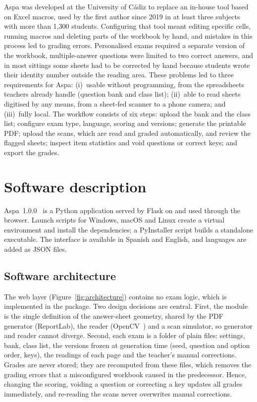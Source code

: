 \documentclass[preprint,12pt, a4paper]{elsarticle}
\begin{document}
Aspa was developed at the University of Cádiz to replace an in-house tool based on Excel macros, used by the first author since 2019 in at least three subjects with more than 1,300 students. Configuring that tool meant editing specific cells, running macros and deleting parts of the workbook by hand, and mistakes in this process led to grading errors. Personalised exams required a separate version of the workbook, multiple-answer questions were limited to two correct answers, and in most sittings some sheets had to be corrected by hand because students wrote their identity number outside the reading area. These problems led to three requirements for Aspa: (i)~usable without programming, from the spreadsheets teachers already handle (question bank and class list); (ii)~able to read sheets digitised by any means, from a sheet-fed scanner to a phone camera; and (iii)~fully local. The workflow consists of six steps: upload the bank and the class list; configure exam type, language, scoring and versions; generate the printable PDF; upload the scans, which are read and graded automatically, and review the flagged sheets; inspect item statistics and void questions or correct keys; and export the grades.

\section{Software description}
\label{sec:description}

Aspa~1.0.0~\cite{aspa} is a Python application served by Flask on  and used through the browser. Launch scripts for Windows, macOS and Linux create a virtual environment and install the dependencies; a PyInstaller script builds a standalone executable. The interface is available in Spanish and English, and languages are added as JSON files.

\subsection{Software architecture}
\label{sec:architecture}

The web layer (Figure~\ref{fig:architecture}) contains no exam logic, which is implemented in the  package. Two design decisions are central. First, the module  is the single definition of the answer-sheet geometry, shared by the PDF generator (ReportLab), the reader (OpenCV~\cite{opencv}) and a scan simulator, so generator and reader cannot diverge. Second, each exam is a folder of plain files: settings, bank, class list, the versions frozen at generation time (seed, question and option order, keys), the readings of each page and the teacher's manual corrections. Grades are never stored; they are recomputed from these files, which removes the grading errors that a misconfigured workbook caused in the predecessor. Hence, changing the scoring, voiding a question or correcting a key updates all grades immediately, and re-reading the scans never overwrites manual corrections.
\end{document}
